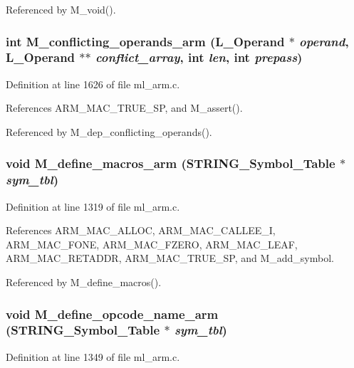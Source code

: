 Referenced by M\_\-void().
\subsubsection{\setlength{\rightskip}{0pt plus 5cm}int M\_\-conflicting\_\-operands\_\-arm (L\_\-Operand $\ast$ {\em operand}, L\_\-Operand $\ast$$\ast$ {\em conflict\_\-array}, int {\em len}, int {\em prepass})}\label{ml__arm_8c_3860d76738ffb1104d4576589a861549}




Definition at line 1626 of file ml\_\-arm.c.

References ARM\_\-MAC\_\-TRUE\_\-SP, and M\_\-assert().

Referenced by M\_\-dep\_\-conflicting\_\-operands().
\subsubsection{\setlength{\rightskip}{0pt plus 5cm}void M\_\-define\_\-macros\_\-arm (\bf{STRING\_\-Symbol\_\-Table} $\ast$ {\em sym\_\-tbl})}\label{ml__arm_8c_a68abfe8777c96a9794a7226c8469c05}




Definition at line 1319 of file ml\_\-arm.c.

References ARM\_\-MAC\_\-ALLOC, ARM\_\-MAC\_\-CALLEE\_\-I, ARM\_\-MAC\_\-FONE, ARM\_\-MAC\_\-FZERO, ARM\_\-MAC\_\-LEAF, ARM\_\-MAC\_\-RETADDR, ARM\_\-MAC\_\-TRUE\_\-SP, and M\_\-add\_\-symbol.

Referenced by M\_\-define\_\-macros().
\subsubsection{\setlength{\rightskip}{0pt plus 5cm}void M\_\-define\_\-opcode\_\-name\_\-arm (\bf{STRING\_\-Symbol\_\-Table} $\ast$ {\em sym\_\-tbl})}\label{ml__arm_8c_f770720b2bce403c4540ced8471204bd}




Definition at line 1349 of file ml\_\-arm.c.

